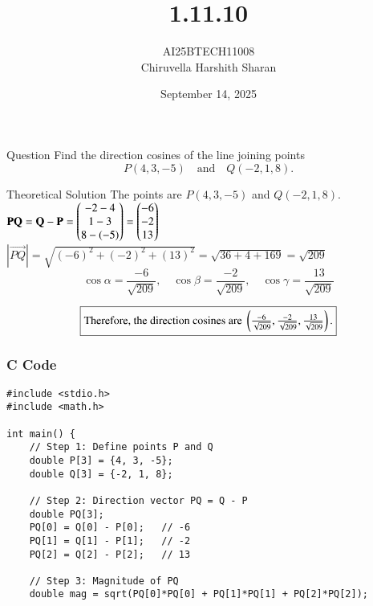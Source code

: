 \documentclass{beamer}
\title
{1.11.10}
\date{September 14, 2025}
\author 
{AI25BTECH11008\\Chiruvella Harshith Sharan}
\begin{document}
\frame{\titlepage}

\begin{frame}{Question}
\centering
Find the direction cosines of the line joining points 
\[
P(4,3,-5) \quad \text{and} \quad Q(-2,1,8).
\]
\end{frame}


\begin{frame}{Theoretical Solution}
The points are $P(4,3,-5)$ and $Q(-2,1,8)$. \\[6pt]

$\mathbf{PQ} = \mathbf{Q} - \mathbf{P} 
= \begin{pmatrix}-2-4 \\ 1-3 \\ 8-(-5)\end{pmatrix} 
= \begin{pmatrix}-6 \\ -2 \\ 13\end{pmatrix}$ \\[10pt]

$|\vec{PQ}| = \sqrt{(-6)^2 + (-2)^2 + (13)^2} 
= \sqrt{36 + 4 + 169} 
= \sqrt{209}$ \\[6pt]

\[
\cos \alpha = \frac{-6}{\sqrt{209}}, \quad
\cos \beta = \frac{-2}{\sqrt{209}}, \quad
\cos \gamma = \frac{13}{\sqrt{209}}
\]

\begin{align}
\centering
\boxed{\text{Therefore, the direction cosines are } 
\left(\tfrac{-6}{\sqrt{209}}, \tfrac{-2}{\sqrt{209}}, \tfrac{13}{\sqrt{209}}\right).}
\end{align}
\end{frame}


\begin{frame}[fragile]
    \frametitle{C Code}
    \begin{lstlisting}
#include <stdio.h>
#include <math.h>

int main() {
    // Step 1: Define points P and Q
    double P[3] = {4, 3, -5};
    double Q[3] = {-2, 1, 8};

    // Step 2: Direction vector PQ = Q - P
    double PQ[3];
    PQ[0] = Q[0] - P[0];   // -6
    PQ[1] = Q[1] - P[1];   // -2
    PQ[2] = Q[2] - P[2];   // 13

    // Step 3: Magnitude of PQ
    double mag = sqrt(PQ[0]*PQ[0] + PQ[1]*PQ[1] + PQ[2]*PQ[2]);

    \end{lstlisting}
\end{frame}
\end{document}
